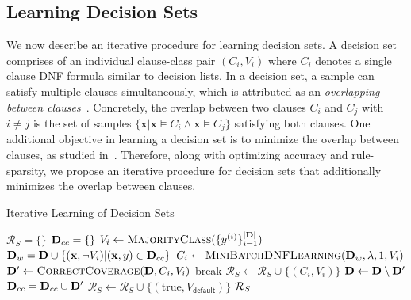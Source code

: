 \subsection{Learning Decision Sets}
We now describe an iterative procedure for learning decision sets. A decision set comprises of an individual clause-class  pair $ (C_i, V_i) $ where $ C_i $ denotes a single clause DNF formula similar to decision lists. In a decision set, a sample can satisfy multiple clauses simultaneously, which is attributed as an \textit{overlapping between clauses}~\cite{lakkaraju2016interpretable}. Concretely, the overlap between two clauses $ C_i $ and $ C_j $ with $ i \ne j $ is the set of samples $ \{\mathbf{x} | \mathbf{x} \models C_i \wedge \mathbf{x} \models C_j\} $ satisfying both clauses. One additional objective in learning a decision set is to minimize the overlap between clauses, as studied in~\cite{lakkaraju2016interpretable}. 
Therefore, along with optimizing accuracy and rule-sparsity, we propose an iterative procedure for decision sets that additionally minimizes the overlap between clauses.

\begin{algorithm}
	\caption{Iterative Learning of Decision Sets}
	\label{interpretability_imli_algo:iterative_decision_sets_learning}
	\begin{algorithmic}[1]
		\State $ \mathcal{R}_S=\{\} $
		\State $ \mathbf{D}_{cc} = \{\}$  
		\State $ V_i \leftarrow \textsc{MajorityClass}(\{y^{(i)}\}_{i=1}^{|\mathbf{D}|}) $
		\State $ \mathbf{D}_{w} = \mathbf{D}  \cup \{(\mathbf{x}, \neg V_i) | (\mathbf{x}, y) \in \mathbf{D}_{cc}\} $ 
		\State $ C_i \leftarrow \textsc{MiniBatchDNFLearning}( \mathbf{D}_w,\lambda, 1, V_i) $ 
		\State $ \mathbf{D}' \leftarrow \textsc{CorrectCoverage}(\mathbf{D}, C_i, V_i) $
		\State break
		\EndIf
		\State $ \mathcal{R}_S \leftarrow \mathcal{R}_S \cup \{(C_i, V_i)\} $
		\State $ \mathbf{D} \leftarrow \mathbf{D}  \setminus \mathbf{D}' $
		\State $ \mathbf{D}_{cc} = \mathbf{D}_{cc} \cup \mathbf{D}' $
		\EndFor
		\State $ \mathcal{R}_S \leftarrow \mathcal{R}_S  \cup \{(\text{true}, V_{\mathsf{default}} )\}$
		\State \Return $ {\mathcal{R}}_S $
		\EndProcedure
	\end{algorithmic}
\end{algorithm} 






